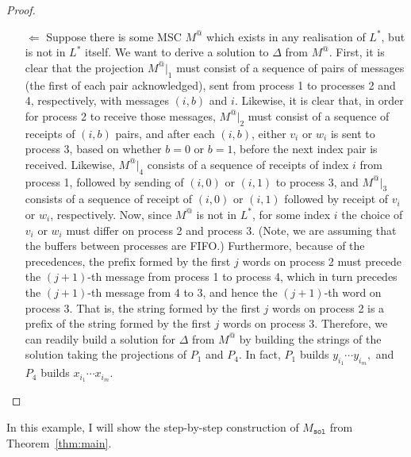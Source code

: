 \begin{proof}
\begin{itemize}
		\item[$\Leftarrow$]
		      Suppose there is some MSC $M^@$ which
		      exists in any realisation of $L^*$, but is not in $L^*$ itself. We want
		      to derive a solution to $\Delta$ from $M^@$.
		      First, it is clear that the projection $M^@|_1$ must consist of a sequence
		      of pairs of messages (the first of each pair acknowledged), sent from
		      process 1 to processes 2 and 4, respectively, with messages $(i, b)$ and $i$.
		      Likewise, it is clear that, in order for process 2 to receive those messages,
		      $M^@|_2$ must consist of a sequence of receipts of $(i, b)$ pairs, and after
		      each $(i, b)$, either $v_i$ or $w_i$ is sent to process 3, based on whether
		      $b = 0$ or $b = 1$, before the next index pair is received.
		      Likewise, $M^@|_4$ consists of a sequence of receipts of index $i$ from
		      process 1, followed by sending of $(i, 0)$ or $(i, 1)$ to process 3, and
		      $M^@|_3$ consists of a sequence of receipt of $(i, 0)$ or $(i, 1)$ followed
		      by receipt of $v_i$ or $w_i$, respectively.
		      Now, since $M^@$ is not in $L^*$, for some index $i$ the choice of $v_i$ or
		      $w_i$ must differ on process 2 and process 3. (Note, we are assuming that
		      the buffers between processes are FIFO.)
		      Furthermore, because of the precedences, the prefix formed by the first
		      $j$ words on process 2 must precede the $(j + 1)$-th message from
		      process 1 to process 4, which in turn precedes the $(j + 1)$-th message
		      from 4 to 3, and hence the $(j + 1)$-th word on process 3. That is, the
		      string formed by the first $j$ words on process 2 is a prefix of the string
		      formed by the first $j$ words on process 3. Therefore, we can readily
		      build a solution for $\Delta$ from $M^@$ by building the strings of the solution
		      taking the projections of $P_1$ and $P_4$. In fact, $P_1$ builds 
			  $y_{i_1}\cdots y_{i_m},$ and $P_4$ builds $x_{i_1}\cdots x_{i_m}$.

	\end{itemize}

\end{proof}

In this example, I will show the step-by-step construction 
of $M_{\texttt{sol}}$ from Theorem~\ref{thm:main}.

\bigskip

